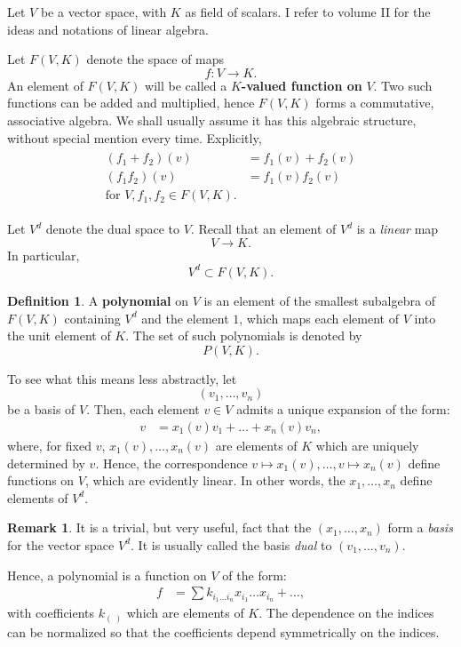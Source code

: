 \documentclass[12pt]{book}
\theoremstyle{plain}
\theoremstyle{definition}
\newtheorem{definition}{Definition}[section]
\newtheorem*{remark}{Remark}
\begin{document}
Let $V$ be a vector space, with $K$ as field of scalars.
I refer to volume II for the ideas and notations of linear algebra.

Let $F(V, K)$ denote the space of maps
$$f: V \to K.$$
An element of $F(V, K)$ will be called a $K$\textbf{-valued function on} $V$.
Two such functions can be added and multiplied, hence $F(V, K)$ forms a commutative, associative algebra.
We shall usually assume it has this algebraic structure, without special mention every time.
Explicitly,
\begin{align*}
\begin{split}
    (f_1 + f_2)(v) &= f_1(v) + f_2(v) \\
    (f_1f_2)(v) &= f_1(v)f_2(v) \\
    \text{for } V, f_1, f_2 \in F(V, K).
\end{split}
\end{align*}

Let $V^d$ denote the dual space to $V$. Recall that an element of $V^d$ is a \emph{linear} map
$$V \to K.$$
In particular,
$$V^d \subset F(V, K).$$

\begin{definition}
    A \textbf{polynomial} on $V$ is an element of the smallest subalgebra of $F(V, K)$ containing $V^d$ and the element $1$, which maps each element of $V$ into the unit element of $K$.
    The set of such polynomials is denoted by
    $$P(V, K).$$
\end{definition}

To see what this means less abstractly, let
$$(v_1, \dots, v_n)$$
be a basis of $V$.
Then, each element $v \in V$ admits a unique expansion of the form:
\begin{align}
    v &= x_1(v)v_1 + \dots + x_n(v)v_n,
\end{align}
where, for fixed $v$, $x_1(v), \dots, x_n(v)$ are elements of $K$ which are uniquely determined by $v$.
Hence, the correspondence $v \mapsto x_1(v), \dots, v \mapsto x_n(v)$ define functions on $V$, which are evidently linear.
In other words, the $x_1, \dots, x_n$ define elements of $V^d$.

\begin{remark}
    It is a trivial, but very useful, fact that the $(x_1, \dots, x_n)$ form a \emph{basis} for the vector space $V^d$.
    It is usually called the basis \emph{dual} to $(v_1, \dots, v_n)$.

    Hence, a polynomial is a function on $V$ of the form:
    \begin{align} \label{eq:PolynomialExpansion1}
        f &= \sum k_{i_1 \dots i_n} x_{i_1} \dots x_{i_n} + \dots,
    \end{align}
    with coefficients $k_{(\ )}$ which are elements of $K$.
    The dependence on the indices can be normalized so that the coefficients depend symmetrically on the indices.
\end{remark}
\end{document}
